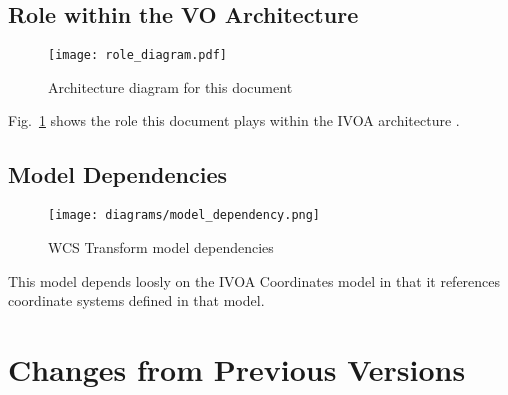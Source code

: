 \documentclass[11pt,a4paper]{ivoa}
\begin{document}
\pagebreak
\subsection{Role within the VO Architecture}

\begin{figure}[h]
\centering


\texttt{[image: role\_diagram.pdf]}
\caption{Architecture diagram for this document}
\label{fig:archdiag}
\end{figure}

Fig.~\ref{fig:archdiag} shows the role this document plays within the
IVOA architecture \citep{note:VOARCH}.

\subsection{Model Dependencies }
  
  \begin{figure}[h]
  \begin{center}
    \texttt{[image: diagrams/model\_dependency.png]}
    \caption{WCS Transform model dependencies}\label{fig:overview}
  \end{center}
  \end{figure}

This model depends loosly on the IVOA Coordinates model in that it references coordinate systems defined in that model.



\appendix
\section{Changes from Previous Versions}
\end{document}
